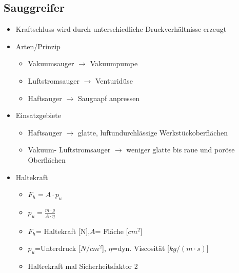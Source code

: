 \begin{minipage}{0.5\linewidth}
    \subsection{Sauggreifer}
    \begin{itemize}
        \item Kraftschluss wird durch unterschiedliche Druckverhältnisse erzeugt
        \item Arten/Prinzip
        \begin{itemize}
            \item Vakuumsauger $\rightarrow$ Vakuumpumpe
            \item Luftstromsauger $\rightarrow$ Venturidüse
            \item Haftsauger $\rightarrow$ Saugnapf anpressen
        \end{itemize}
        \item Einsatzgebiete
        \begin{itemize}
            \item Haftsauger $\rightarrow$ glatte, luftundurchlässige Werkstückoberflächen
            \item Vakuum- Luftstromsauger $\rightarrow$ weniger glatte bis raue und poröse Oberflächen
        \end{itemize}
        \item Haltekraft
        \begin{itemize}
            \item $ F_h=A\cdot p_u$
            \item $ p_u= \frac{m\cdot g}{A \cdot \eta}$
            \item $F_h$= Haltekraft [N],$A$= Fläche [$cm^2$]
            \item $p_u$=Unterdruck [$N/cm^2$], $\eta$=dyn. Viscosität [$kg/(m\cdot s)$]
            \item Haltrekraft mal Sicherheitsfaktor 2
        \end{itemize}
    \end{itemize}


\end{minipage}
